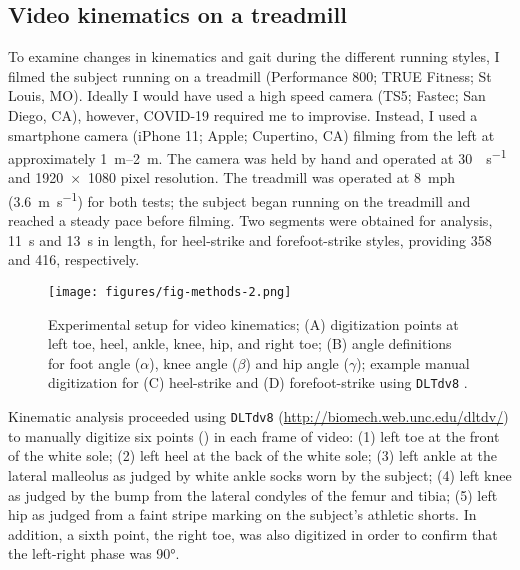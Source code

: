 \subsection{Video kinematics on a treadmill}
To examine changes in kinematics and gait during the different running styles, I filmed the subject running on a treadmill (Performance 800; TRUE Fitness; St Louis, MO). Ideally I would have used a high speed camera (TS5; Fastec; San Diego, CA), however, COVID-19 required me to improvise. Instead, I used a smartphone camera (iPhone 11; Apple; Cupertino, CA) filming from the left at approximately \SIrange{1}{2}{\meter}. The camera was held by hand and operated at \SI{30}{\frame\per\second} and \num{1920x1080} pixel resolution. The treadmill was operated at \SI{8}{mph} (\SI{3.6}{\meter\per\second}) for both tests; the subject began running on the treadmill and reached a steady pace before filming.  Two segments were obtained for analysis, \SI{11}{\second} and \SI{13}{\second} in length, for heel-strike and forefoot-strike styles, providing \SI{358}{\frame} and \SI{416}{\frame}, respectively.
\begin{figure}
\begin{center}
\texttt{[image: figures/fig-methods-2.png]}
\end{center}
\caption{Experimental setup for video kinematics; (A) digitization points at left toe, heel, ankle, knee, hip, and right toe; (B) angle definitions for foot angle ($\alpha$), knee angle ($\beta$) and hip angle ($\gamma$); example manual digitization for (C) heel-strike and (D) forefoot-strike using \lstinline{DLTdv8} \citep{hedrick2008software}.}
\label{fig:methods:kinematics}
\end{figure}

Kinematic analysis proceeded using \citet{hedrick2008software} \lstinline{DLTdv8} (\url{http://biomech.web.unc.edu/dltdv/}) to manually digitize six points () in each frame of video: (1) left toe at the front of the white sole; (2) left heel at the back of the white sole; (3) left ankle at the lateral malleolus as judged by white ankle socks worn by the subject; (4) left knee as judged by the bump from the lateral condyles of the femur and tibia; (5) left hip as judged from a faint stripe marking on the subject's athletic shorts. In addition, a sixth point, the right toe, was also digitized in order to confirm that the left-right phase was \ang{90}. 

